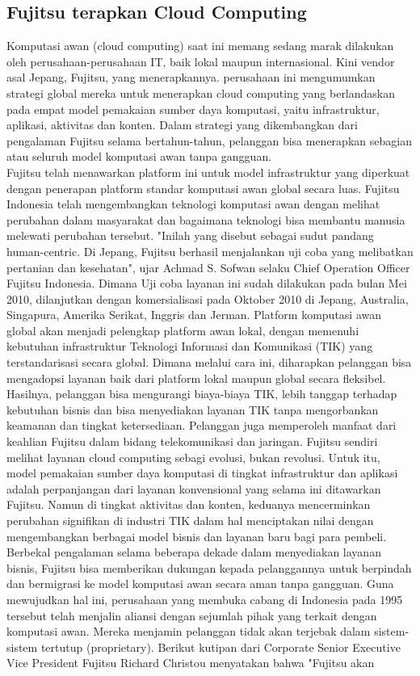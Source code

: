 \subsection{Fujitsu terapkan Cloud Computing}
\tab Komputasi awan (cloud computing) saat ini memang sedang marak dilakukan oleh
perusahaan-perusahaan IT, baik lokal maupun internasional. Kini vendor asal Jepang, Fujitsu, yang menerapkannya. perusahaan ini mengumumkan strategi global mereka untuk menerapkan cloud computing yang berlandaskan pada empat model pemakaian sumber daya komputasi, yaitu infrastruktur, aplikasi, aktivitas dan konten. Dalam strategi yang dikembangkan dari pengalaman Fujitsu selama bertahun-tahun, pelanggan bisa menerapkan sebagian atau seluruh model komputasi awan tanpa gangguan. \\Fujitsu telah menawarkan platform ini untuk model infrastruktur yang diperkuat dengan penerapan platform standar komputasi awan global secara luas. Fujitsu Indonesia telah mengembangkan teknologi komputasi awan dengan melihat perubahan dalam masyarakat dan bagaimana teknologi bisa membantu manusia melewati perubahan tersebut. "Inilah yang disebut sebagai sudut pandang human-centric. Di Jepang, Fujitsu berhasil menjalankan uji coba yang melibatkan pertanian dan kesehatan", ujar Achmad S. Sofwan selaku Chief Operation Officer Fujitsu Indonesia. Dimana Uji coba layanan ini sudah dilakukan pada bulan Mei 2010, dilanjutkan dengan komersialisasi pada Oktober 2010 di Jepang, Australia, Singapura, Amerika Serikat, Inggris dan Jerman. Platform komputasi awan global akan menjadi pelengkap platform awan lokal, dengan memenuhi kebutuhan infrastruktur Teknologi Informasi dan Komunikasi (TIK) yang terstandarisasi secara global. Dimana melalui cara ini, diharapkan pelanggan bisa mengadopsi layanan baik dari platform lokal maupun global secara fleksibel. \\Hasilnya, pelanggan bisa mengurangi biaya-biaya TIK, lebih tanggap terhadap kebutuhan bisnis dan bisa menyediakan layanan TIK tanpa mengorbankan keamanan dan tingkat ketersediaan. Pelanggan juga memperoleh manfaat dari keahlian Fujitsu dalam bidang telekomunikasi dan jaringan. Fujitsu sendiri melihat layanan cloud computing sebagi evolusi, bukan revolusi. Untuk itu, model pemakaian sumber daya komputasi di tingkat infrastruktur dan aplikasi adalah perpanjangan dari layanan konvensional yang selama ini ditawarkan Fujitsu. Namun di tingkat aktivitas dan konten, keduanya mencerminkan perubahan signifikan di industri TIK dalam hal menciptakan nilai dengan mengembangkan berbagai model bisnis dan layanan baru bagi para pembeli. \\Berbekal pengalaman selama beberapa dekade dalam menyediakan layanan bisnis, Fujitsu bisa memberikan dukungan kepada pelanggannya untuk berpindah dan bermigrasi ke model komputasi awan secara aman tanpa gangguan. Guna mewujudkan hal ini, perusahaan yang membuka cabang di Indonesia pada 1995 tersebut telah menjalin aliansi dengan sejumlah pihak yang terkait dengan komputasi awan. Mereka menjamin pelanggan tidak akan terjebak dalam sistem-sistem tertutup (proprietary). Berikut kutipan dari Corporate Senior Executive Vice President Fujitsu Richard Christou menyatakan bahwa "Fujitsu akan 